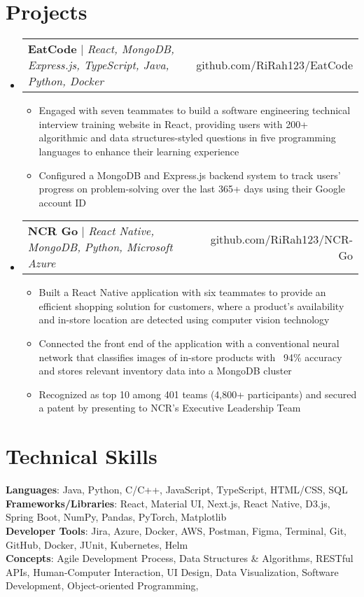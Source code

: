 \documentclass[letterpaper,10pt]{article}
\makeatletter
\newcommand{\resumeItem}[1]{
  \item\small{
    {#1 \vspace{-2pt}}
  }
}
\newcommand{\resumeProjectHeading}[2]{
    \item
    \begin{tabular*}{0.97\textwidth}{l@{\extracolsep{\fill}}r}
      \small#1 & #2 \\
    \end{tabular*}\vspace{-7pt}
}
\newcommand{\resumeSubHeadingListStart}{\begin{itemize}[leftmargin=0.15in, label={}]}
\newcommand{\resumeSubHeadingListEnd}{\end{itemize}}
\newcommand{\resumeItemListStart}{\begin{itemize}}
\newcommand{\resumeItemListEnd}{\end{itemize}\vspace{-5pt}}
\makeatother
\begin{document}
\section{Projects}
    \resumeSubHeadingListStart
      \resumeProjectHeading
          {\textbf{EatCode} $|$ \emph{React, MongoDB, Express.js, TypeScript, Java, Python, Docker}}{github.com/RiRah123/EatCode}
          \resumeItemListStart
            \resumeItem{Engaged with seven teammates to build a software engineering technical interview training website in React, providing users with 200+ algorithmic and data structures-styled questions in five programming languages to enhance their learning experience}
            \resumeItem{Configured a MongoDB and Express.js backend system to track users' progress on problem-solving over the last 365+ days using their Google account ID}
          \resumeItemListEnd
      
      \resumeProjectHeading
          {\textbf{NCR Go} $|$ \emph{React Native, MongoDB, Python, Microsoft Azure}}{github.com/RiRah123/NCR-Go}
          \resumeItemListStart
            \resumeItem{Built a React Native application with six teammates to provide an efficient shopping solution for customers, where a product’s availability and in-store location are detected using computer vision technology}
            \resumeItem{Connected the front end of the application with a conventional neural network that classifies images of in-store products with ~94\% accuracy and stores relevant inventory data into a MongoDB cluster}
            \resumeItem{Recognized as top 10 among 401 teams (4,800+ participants) and secured a patent by presenting to NCR's Executive Leadership Team}
          \resumeItemListEnd
    \resumeSubHeadingListEnd



%
\section{Technical Skills}
\begin{itemize}[leftmargin=0.15in, label={}]
    \small{\item{
        \textbf{Languages}{: Java, Python, C/C++, JavaScript, TypeScript, HTML/CSS, SQL} \\
        \textbf{Frameworks/Libraries}{: React, Material UI, Next.js, React Native, D3.js, Spring Boot, NumPy, Pandas, PyTorch, Matplotlib} \\
        \textbf{Developer Tools}{: Jira, Azure, Docker, AWS, Postman, Figma, Terminal, Git, GitHub, Docker, JUnit, Kubernetes, Helm} \\
        \textbf{Concepts}{: Agile Development Process, Data Structures \& Algorithms, RESTful APIs, Human-Computer Interaction, UI Design, Data Visualization, Software Development, Object-oriented Programming,} \\
        }}
\end{itemize}



\end{document}
